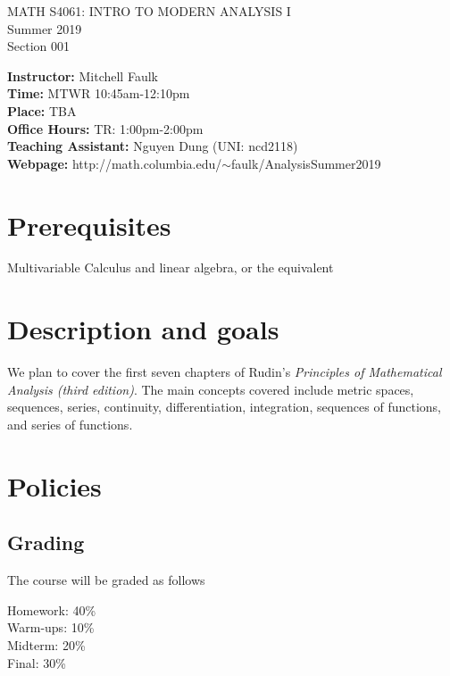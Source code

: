 \documentclass[12pt]{article}
\begin{document}
\begin{center}
MATH S4061: INTRO TO MODERN ANALYSIS I  \\
Summer 2019  \\
Section 001
\end{center}


\noindent \textbf{Instructor:} Mitchell Faulk \\
\textbf{Time:} MTWR 10:45am-12:10pm  \\
\textbf{Place:} TBA \\
\textbf{Office Hours:} TR: 1:00pm-2:00pm \\
\textbf{Teaching Assistant:} Nguyen Dung (UNI: ncd2118) \\
\textbf{Webpage:} http://math.columbia.edu/$\sim$faulk/AnalysisSummer2019

\section*{Prerequisites} 

Multivariable Calculus and linear algebra, or the equivalent


\section*{Description and goals}


We plan to cover the first seven chapters of Rudin's \emph{Principles of Mathematical Analysis (third edition)}. The main concepts covered include metric spaces, sequences, series, continuity, differentiation, integration, sequences of functions, and series of functions. 




\section*{Policies}

\subsection*{Grading}

The course will be graded as follows 

\vspace{3mm}


\noindent Homework: 40\%\\
Warm-ups: 10\% \\
Midterm: 20\% \\
Final: 30\%
\end{document}
